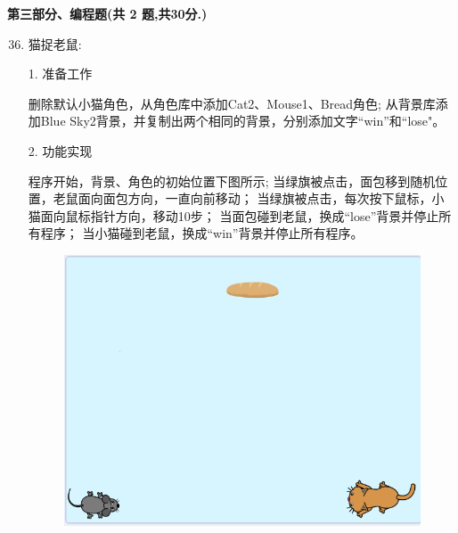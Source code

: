 \documentclass[10pt, a4paper]{article}
\begin{document}
    \newpage
    {\noindent \textbf{第三部分、编程题(共 2 题,共30分.)}}
    \begin{enumerate}
        \setcounter{enumi}{35}
        
        \item 猫捉老鼠:
        
        1. 准备工作
        \begin{tasks}[label = (\arabic*)]
            \task 删除默认小猫角色，从角色库中添加Cat2、Mouse1、Bread角色;
            \task 从背景库添加Blue Sky2背景，并复制出两个相同的背景，分别添加文字“win”和“lose"。
        \end{tasks}
        2. 功能实现
        \begin{tasks}[label = (\arabic*)]
            \task 程序开始，背景、角色的初始位置下图所示;
            \task 当绿旗被点击，面包移到随机位置，老鼠面向面包方向，一直向前移动；
            \task 当绿旗被点击，每次按下鼠标，小猫面向鼠标指针方向，移动10步；
            \task 当面包碰到老鼠，换成“lose”背景并停止所有程序；
            \task 当小猫碰到老鼠，换成“win”背景并停止所有程序。
        \end{tasks}
        \begin{figure}[htbp]
            \centering
            \begin{minipage}[t]{.29\textwidth}
                \centering
                \includegraphics[width=\textwidth]{figure/36-1.png}
            \end{minipage}
            \begin{minipage}[t]{.29\textwidth}
                \centering

\end{minipage}
\end{figure}
\end{enumerate}
\end{document}
